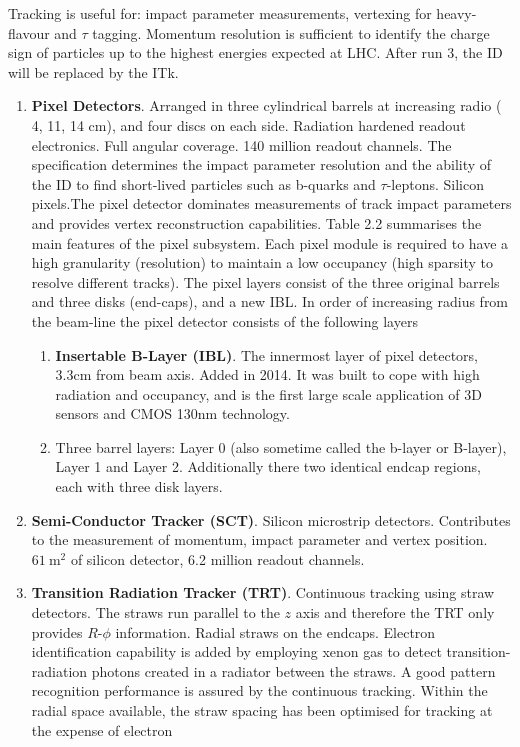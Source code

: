 \begin{enumerate}
    Tracking is useful for: impact parameter measurements, vertexing for heavy-flavour and $\tau$ tagging. Momentum resolution is sufficient to identify the charge sign of particles up to the highest energies expected at LHC. After run 3, the ID will be replaced by the ITk.
    \begin{enumerate}
        \item \textbf{Pixel Detectors}. Arranged in three cylindrical barrels at increasing radio ( 4, 11, 14 cm), and four discs on each side. Radiation hardened readout electronics. Full angular coverage. 140 million readout channels. The specification determines the impact parameter resolution and the ability of the ID to find short-lived particles such as b-quarks and $\tau$-leptons. Silicon pixels.The pixel detector dominates measurements of track impact parameters and provides vertex reconstruction capabilities. Table 2.2 summarises the main features of the pixel subsystem. Each pixel module is required to have a high granularity (resolution) to maintain a low occupancy (high sparsity to resolve different tracks). The pixel layers consist of the three original barrels and three disks (end-caps), and a new IBL. In order of increasing radius from the beam-line the pixel detector consists of the following layers
        \begin{enumerate}
            \item \textbf{Insertable B-Layer (IBL)}. The innermost layer of pixel detectors, 3.3cm from beam axis. Added in 2014. It was built to cope with high radiation and occupancy, and is the first large scale application of 3D sensors and CMOS 130nm technology.
            \item Three barrel layers: Layer 0 (also sometime called the b-layer or B-layer), Layer 1 and Layer 2. Additionally there two identical endcap regions, each with three disk layers.
        \end{enumerate}
        \item \textbf{Semi-Conductor Tracker (SCT)}. Silicon microstrip detectors. Contributes to the measurement of momentum, impact parameter and vertex position. $61 ~\textrm{m}^2$ of silicon detector, 6.2 million readout channels.
        \item \textbf{Transition Radiation Tracker (TRT)}. Continuous tracking using straw detectors. The straws run parallel to the $z$ axis and therefore the TRT only provides $R$\nobreakdash-$\phi$ information. Radial straws on the endcaps. Electron identification capability is added by employing xenon gas to detect transition-radiation photons created in a radiator between the straws. A good pattern recognition performance is assured by the continuous tracking. Within the radial space available, the straw spacing has been optimised for tracking at the expense of electron

\end{enumerate}
\end{enumerate}
